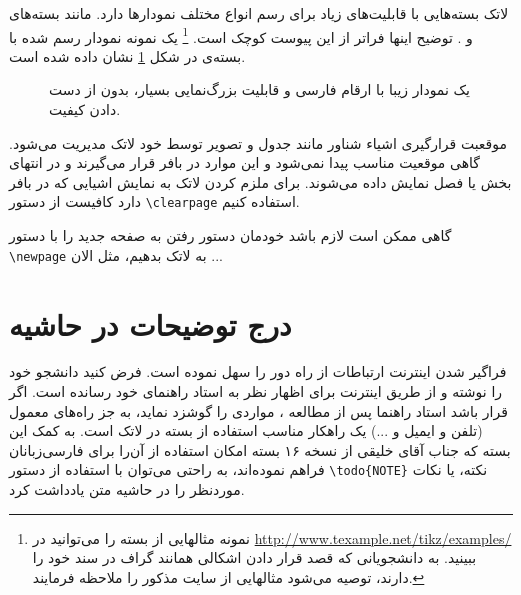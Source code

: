 \setRTLparagraphfootnotes
لاتک بسته‌هایی با قابلیت‌های زیاد برای رسم انواع مختلف نمودارها دارد. مانند بسته‌های  و  . توضیح اینها فراتر از این پیوست کوچک است.
\footnote{
نمونه مثالهایی از بسته  را می‌توانید
 در \url{http://www.texample.net/tikz/examples/} ببینید. به دانشجویانی که قصد قرار دادن اشکالی همانند گراف در سند خود را دارند، توصیه می‌شود مثالهایی از سایت مذکور را ملاحظه فرمایند.}
یک نمونه نمودار رسم شده با بسته‌ی 
 در شکل 
\ref{fig:parabola}
نشان داده شده است.
\begin{figure}[t]
\centering
{}
\caption{یک نمودار زیبا با ارقام فارسی و قابلیت بزرگ‌نمایی بسیار، بدون از دست دادن کیفیت.}
\label{fig:parabola}
\end{figure}
موقعبت قرارگیری اشیاء شناور مانند جدول و تصویر توسط خود لاتک مدیریت می‌شود. گاهی موقعیت مناسب پیدا نمی‌شود و این موارد در بافر قرار می‌گیرند و در انتهای بخش یا فصل نمایش داده می‌شوند. برای ملزم کردن لاتک به نمایش اشیايی که در بافر دارد کافیست از دستور 
\verb!\clearpage!
استفاده کنیم.

 گاهی  ممکن است لازم باشد خودمان دستور رفتن به صفحه جدید را با دستور 
\verb!\newpage!
به لاتک بدهیم، مثل الان ...
\newpage




\section{درج توضیحات در حاشیه}
\setLTRparagraphfootnotes
فراگیر شدن اینترنت ارتباطات از راه دور را سهل نموده است. فرض کنید دانشجو \پ خود را نوشته و از طریق اینترنت برای اظهار نظر به استاد راهنمای خود رسانده است. اگر قرار باشد استاد راهنما پس از مطالعه \پ، مواردی را  گوشزد نماید، به جز راه‌های معمول (تلفن و ایمیل و ...) یک راهکار مناسب استفاده از بسته 
در لاتک است. به کمک این بسته که جناب آقای خلیقی از نسخه ۱۶ بسته
امکان استفاده از آن‌را برای فارسی‌زبانان فراهم نموده‌اند، به راحتی می‌توان با استفاده از دستور
\verb!\todo{NOTE}!
نکته، یا نکات موردنظر  را در حاشیه متن یادداشت کرد.  

